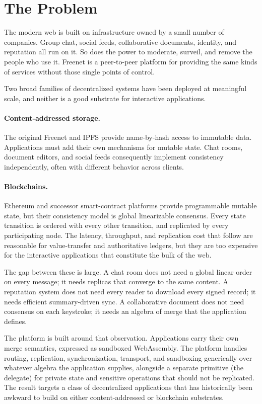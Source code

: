 \section{The Problem}
\label{sec:problem}

The modern web is built on infrastructure owned by a small number of companies. Group chat, social feeds, collaborative documents, identity, and reputation all run on it. So does the power to moderate, surveil, and remove the people who use it. Freenet is a peer-to-peer platform for providing the same kinds of services without those single points of control.

Two broad families of decentralized systems have been deployed at meaningful scale, and neither is a good substrate for interactive applications.

\paragraph{Content-addressed storage.} The original Freenet \citep{clarke2001freenet} and IPFS \citep{benet2014ipfs} provide name-by-hash access to immutable data. Applications must add their own mechanisms for mutable state. Chat rooms, document editors, and social feeds consequently implement consistency independently, often with different behavior across clients.

\paragraph{Blockchains.} Ethereum \citep{wood2014ethereum} and successor smart-contract platforms provide programmable mutable state, but their consistency model is global linearizable consensus. Every state transition is ordered with every other transition, and replicated by every participating node. The latency, throughput, and replication cost that follow are reasonable for value-transfer and authoritative ledgers, but they are too expensive for the interactive applications that constitute the bulk of the web.

The gap between these is large. A chat room does not need a global linear order on every message; it needs replicas that converge to the same content. A reputation system does not need every reader to download every signed record; it needs efficient summary-driven sync. A collaborative document does not need consensus on each keystroke; it needs an algebra of merge that the application defines.

The platform is built around that observation. Applications carry their own merge semantics, expressed as sandboxed WebAssembly. The platform handles routing, replication, synchronization, transport, and sandboxing generically over whatever algebra the application supplies, alongside a separate primitive (the delegate) for private state and sensitive operations that should not be replicated. The result targets a class of decentralized applications that has historically been awkward to build on either content-addressed or blockchain substrates.

